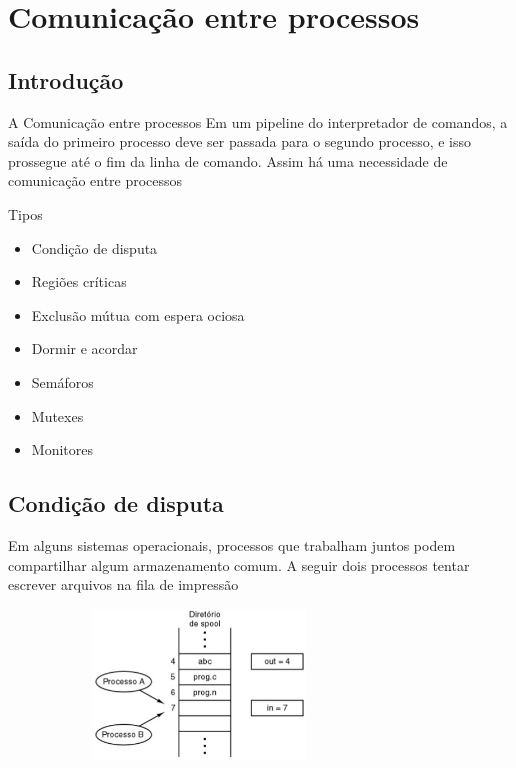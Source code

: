 \documentclass[11pt]{beamer}
\begin{document}
\section{Comunicação entre processos}
\subsection*{Introdução}

\begin{frame}{ A Comunicação entre processos}
 Em um pipeline do interpretador de comandos, a saída do primeiro processo deve ser passada para o segundo processo, e isso prossegue até o 
 fim da linha de comando. Assim há uma necessidade de comunicação entre processos
\pause
 \begin{block}{Tipos}
 \begin{itemize}
  \item Condição de disputa
  \pause
  \item Regiões críticas
  \pause
  \item Exclusão mútua com espera ociosa
  \pause
  \item Dormir e acordar
  \pause
  \item Semáforos
  \pause
  \item Mutexes
  \pause
  \item Monitores
 \end{itemize}
 \end{block}
  
\end{frame}


\subsection*{Condição de disputa}
\begin{frame}
  Em alguns sistemas operacionais, processos que trabalham juntos podem compartilhar algum armazenamento comum.
  A seguir dois processos tentar escrever arquivos na fila de impressão
 \begin{figure}[h]
  \includegraphics[width=80mm, height=40mm]{Figuras/disputa}
  \end{figure}

\end{frame}
\end{document}
